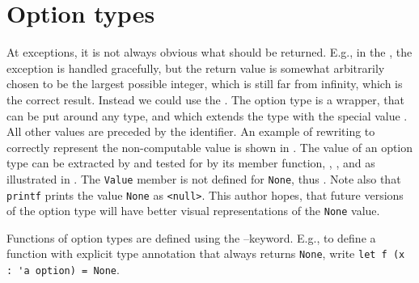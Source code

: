 \section{Option types}
\label{sec:optionType}
At exceptions, it is not always obvious what should be returned. E.g., in the , the exception is handled gracefully, but the return value is somewhat arbitrarily chosen to be the largest possible integer, which is still far from infinity, which is the correct result. Instead we could use the . The option type is a wrapper, that can be put around any type, and which extends the type with the special value . All other values are preceded by the  identifier. An example of rewriting  to correctly represent the non-computable value is shown in .
%
%
The value of an option type can be extracted by and tested for by its member function, , , and  as illustrated in .
%
%
The \lstinline{Value} member is not defined for \lstinline{None}, thus . Note also that \lstinline{printf} prints the value \lstinline{None} as \lstinline{<null>}. This author hopes, that future versions of the option type will have better visual representations of the \lstinline{None} value.

Functions of option types are defined using the --keyword. E.g., to define a function with explicit type annotation that always returns \lstinline{None}, write \lstinline{let f (x : 'a option) = None}.

